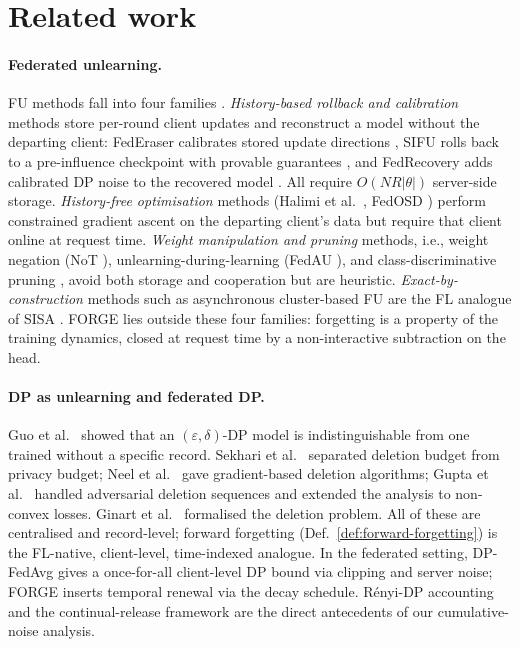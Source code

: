 \section{Related work}
\label{sec:related}

\paragraph{Federated unlearning.}
FU methods fall into four families \cite{jeong2024sok,zhao2023fu-survey}.
\emph{History-based rollback and calibration} methods store per-round client updates
and reconstruct a model without the departing client: FedEraser calibrates stored
update directions \cite{liu2021federaser}, SIFU rolls back to a pre-influence
checkpoint with provable guarantees \cite{fraboni2024sifu}, and FedRecovery adds
calibrated DP noise to the recovered model \cite{zhang2023fedrecovery}. All require
$O(N R |\theta|)$ server-side storage. \emph{History-free optimisation} methods
(Halimi et al.\ \cite{halimi2022}, FedOSD \cite{fedosd2025}) perform constrained
gradient ascent on the departing client's data but require that client online at
request time. \emph{Weight manipulation and pruning} methods, i.e., weight negation
(NoT \cite{khalil2025not}), unlearning-during-learning (FedAU \cite{gu2024fedau}), and
class-discriminative pruning \cite{wang2022class-pruning}, avoid both storage and
cooperation but are heuristic. \emph{Exact-by-construction} methods such as
asynchronous cluster-based FU \cite{su2023async-fu} are the FL analogue of SISA
\cite{bourtoule2021sisa}. FORGE lies outside these four families: forgetting is a
property of the training dynamics, closed at request time by a non-interactive
subtraction on the head.

\paragraph{DP as unlearning and federated DP.}
Guo et al.\ \cite{guo2020certified} showed that an $(\varepsilon,\delta)$-DP model is
indistinguishable from one trained without a specific record. Sekhari et al.\
\cite{sekhari2021remember} separated deletion budget from privacy budget; Neel et al.\
\cite{neel2021descent} gave gradient-based deletion algorithms; Gupta et al.\
\cite{gupta2021adaptive} handled adversarial deletion sequences and extended the
analysis to non-convex losses. Ginart et al.\ \cite{ginart2019making} formalised the
deletion problem. All of these are centralised and record-level; forward forgetting
(Def.~\ref{def:forward-forgetting}) is the FL-native, client-level, time-indexed
analogue. In the federated setting, DP-FedAvg \cite{mcmahan2018learning} gives a
once-for-all client-level DP bound via clipping and server noise; FORGE inserts
temporal renewal via the decay schedule. Rényi-DP accounting
\cite{mironov2017renyi,abadi2016dpsgd} and the continual-release framework
\cite{chan2011private,dwork2010differential} are the direct antecedents of our
cumulative-noise analysis.

